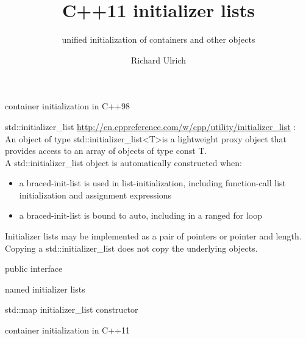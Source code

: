 \documentclass[11pt]{beamer}
\author{Richard Ulrich}
\title{C++11 initializer lists}
\subtitle{unified initialization of containers and other objects}
\institute{cubx Software AG}
\begin{document}
\begin{frame}
\titlepage
\end{frame}


\begin{frame}{container initialization in C++98}

\end{frame}

\begin{frame}{std::initializer\_list}
\href{http://en.cppreference.com/w/cpp/utility/initializer\_list}{http://en.cppreference.com/w/cpp/utility/initializer\_list} :
\\[0.2cm]
An object of type std::initializer\_list\textless T\textgreater is a lightweight proxy object that provides access to an array of objects of type const T.
\pause
\\[0.2cm]
A std::initializer\_list object is automatically constructed when:
\begin{itemize}
\item a braced-init-list is used in list-initialization, including function-call list initialization and assignment expressions
\item a braced-init-list is bound to auto, including in a ranged for loop 
\end{itemize}
\pause
Initializer lists may be implemented as a pair of pointers or pointer and length. Copying a std::initializer\_list does not copy the underlying objects. 
\end{frame}

\begin{frame}{public interface}

\end{frame}

\begin{frame}{named initializer lists}

\end{frame}

\begin{frame}{std::map initializer\_list constructor}

\end{frame}

\begin{frame}{container initialization in C++11}

\end{frame}
\end{document}
